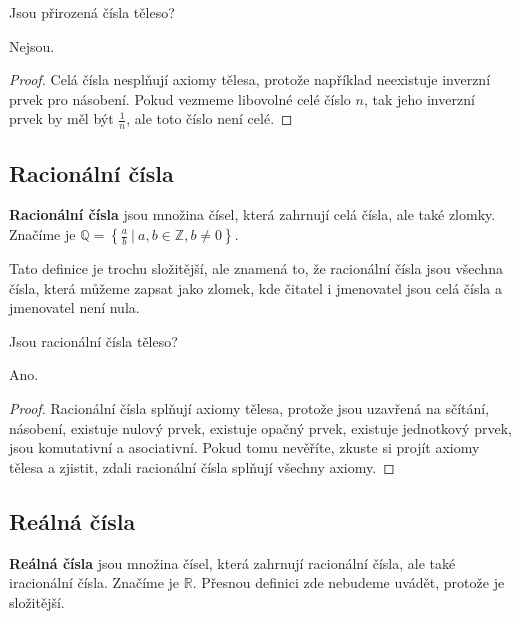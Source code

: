 \begin{problem}
  Jsou přirozená čísla těleso?
\end{problem}

\begin{solution}
  Nejsou.

  \begin{proof}
    Celá čísla nesplňují axiomy tělesa, protože například neexistuje inverzní prvek pro násobení. Pokud vezmeme libovolné celé číslo $n$, tak jeho inverzní prvek by měl být $\frac{1}{n}$, ale toto číslo není celé.
  \end{proof}
\end{solution}

\subsection{Racionální čísla}
\begin{definitionbox}
  \textbf{Racionální čísla} jsou množina čísel, která zahrnují celá čísla, ale také zlomky. Značíme je $\mathbb{Q} = \left\{\frac{a}{b}\ |\ a, b\in\mathbb{Z}, b\neq 0\right\}$.\ \vspace{2mm}

  Tato definice je trochu složitější, ale znamená to, že racionální čísla jsou všechna čísla, která můžeme zapsat jako zlomek, kde čitatel i jmenovatel jsou celá čísla a jmenovatel není nula. 
\end{definitionbox}

\begin{problem}
  Jsou racionální čísla těleso?
\end{problem}

\begin{solution}
  Ano.

  \begin{proof}
    Racionální čísla splňují axiomy tělesa, protože jsou uzavřená na sčítání, násobení, existuje nulový prvek, existuje opačný prvek, existuje jednotkový prvek, jsou komutativní a asociativní. Pokud tomu nevěříte, zkuste si projít axiomy tělesa a zjistit, zdali racionální čísla splňují všechny axiomy.
  \end{proof}
\end{solution}

\subsection{Reálná čísla}
\begin{definitionbox}
  \textbf{Reálná čísla} jsou množina čísel, která zahrnují racionální čísla, ale také iracionální čísla. Značíme je $\mathbb{R}$. Přesnou definici zde nebudeme uvádět, protože je složitější.
\end{definitionbox}

